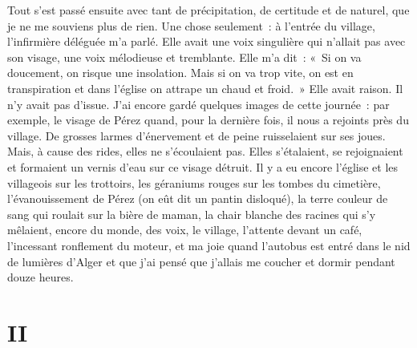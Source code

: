 \documentclass[french,twoside]{book} %
\newcommand\chapteropen{} %
\newcommand\chapterclose{} %
\begin{document}
Tout s’est passé ensuite avec tant de précipitation, de certitude et de naturel, que je ne me souviens plus de rien. Une chose seulement : à l’entrée du village, l’infirmière déléguée m’a parlé. Elle avait une voix singulière qui n’allait pas avec son visage, une voix mélodieuse et tremblante. Elle m’a dit : « Si on va doucement, on risque une insolation. Mais si on va trop vite, on est en transpiration et dans l’église on attrape un chaud et froid. » Elle avait raison. Il n’y avait pas d’issue. J'ai encore gardé quelques images de cette journée : par exemple, le visage de Pérez quand, pour la dernière fois, il nous a rejoints près du village. De grosses larmes d’énervement et de peine ruisselaient sur ses joues. Mais, à cause des rides, elles ne s’écoulaient pas. Elles s’étalaient, se rejoignaient et formaient un vernis d’eau sur ce visage détruit. Il y a eu encore l’église et les villageois sur les trottoirs, les géraniums rouges sur les tombes du cimetière, l’évanouissement de Pérez (on eût dit un pantin disloqué), la terre couleur de sang qui roulait sur la bière de maman, la chair blanche des racines qui s’y mêlaient, encore du monde, des voix, le village, l’attente devant un café, l’incessant ronflement du moteur, et ma joie quand l’autobus est entré dans le nid de lumières d’Alger et que j’ai pensé que j’allais me coucher et dormir pendant douze heures.
\chapterclose


\chapteropen
\chapter[{II}]{II}
\label{I2}
\end{document}
